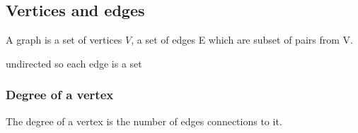
\subsection{Vertices and edges}

A graph is a set of vertices \(V\), a set of edges E which are subset of pairs from V.

undirected so each edge is a set

\subsubsection{Degree of a vertex}

The degree of a vertex is the number of edges connections to it.

